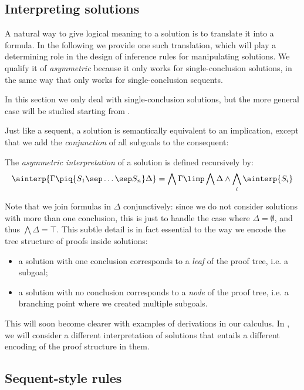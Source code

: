 \subsection{Interpreting solutions}

A natural way to give logical meaning to a solution is to translate it into a
formula. In the following we provide one such translation, which will play a
determining role in the design of inference rules for manipulating solutions. We
qualify it of \emph{asymmetric} because it only works for single-conclusion
solutions, in the same way that  only works for single-conclusion
sequents.

\begin{remark}
In this section we only deal with single-conclusion solutions, but the more
general case will be studied starting from .
\end{remark}

Just like a sequent, a solution is semantically equivalent to an implication,
except that we add the \emph{conjunction} of all subgoals to the consequent:

\begin{definition}
  The \emph{asymmetric interpretation} of a solution is defined recursively by:
  $$\ainterp{\Gamma \piq{S_1 \sep \ldots \sep S_n} \Delta} = \bigwedge \Gamma
    \limp \bigwedge \Delta \land \bigwedge_i{\ainterp{S_i}}$$
\end{definition}

Note that we join formulas in $\Delta$ conjunctively: since we do not consider
solutions with more than one conclusion, this is just to handle the case where
$\Delta = \emptyset$, and thus $\bigwedge \Delta = \top$. This subtle detail is
in fact essential to the way we encode the tree structure of proofs inside
solutions:
\begin{itemize}
  \item a solution with one conclusion corresponds to a \emph{leaf} of the proof
  tree, i.e. a subgoal;
  \item a solution with no conclusion corresponds to a \emph{node} of the proof
  tree, i.e. a branching point where we created multiple subgoals.
\end{itemize}
This will soon become clearer with examples of derivations in our calculus. In
, we will consider a different interpretation of
solutions that entails a different encoding of the proof structure in them.

\subsection{Sequent-style rules}


